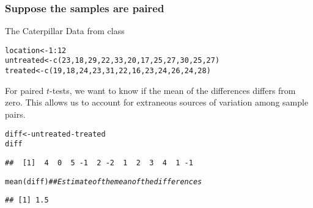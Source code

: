\documentclass[color=usenames,dvipsnames]{beamer}\usepackage[]{graphicx}\usepackage[]{color}
\makeatletter
\newcommand{\hlnum}[1]{\textcolor[rgb]{0.69,0.494,0}{#1}}%
\newcommand{\hlcom}[1]{\textcolor[rgb]{0.514,0.506,0.514}{\textit{#1}}}%
\newcommand{\hlopt}[1]{\textcolor[rgb]{0,0,0}{#1}}%
\newcommand{\hlstd}[1]{\textcolor[rgb]{0,0,0}{#1}}%
\newcommand{\hlkwb}[1]{\textcolor[rgb]{0,0.341,0.682}{#1}}%
\newcommand{\hlkwd}[1]{\textcolor[rgb]{0.004,0.004,0.506}{#1}}%
\newenvironment{kframe}{%
 \def\at@end@of@kframe{}%
 \ifinner\ifhmode%
  \def\at@end@of@kframe{\end{minipage}}%
  \begin{minipage}{\columnwidth}%
 \fi\fi%
 \def\FrameCommand##1{\hskip\@totalleftmargin \hskip-\fboxsep
 \colorbox{shadecolor}{##1}\hskip-\fboxsep
     \hskip-\linewidth \hskip-\@totalleftmargin \hskip\columnwidth}%
 \MakeFramed {\advance\hsize-\width
   \@totalleftmargin\z@ \linewidth\hsize
   \@setminipage}}%
 {\par\unskip\endMakeFramed%
 \at@end@of@kframe}
\newenvironment{knitrout}{}{} %
\makeatother
\begin{document}
\begin{frame}[fragile]
  \frametitle{Suppose the samples are paired}
  {%
    The Caterpillar Data from class}
\begin{knitrout}
\color{fgcolor}\begin{kframe}
\begin{alltt}
\hlstd{location} \hlkwb{<-} \hlnum{1}\hlopt{:}\hlnum{12}
\hlstd{untreated} \hlkwb{<-} \hlkwd{c}\hlstd{(}\hlnum{23}\hlstd{,}\hlnum{18}\hlstd{,}\hlnum{29}\hlstd{,}\hlnum{22}\hlstd{,}\hlnum{33}\hlstd{,}\hlnum{20}\hlstd{,}\hlnum{17}\hlstd{,}\hlnum{25}\hlstd{,}\hlnum{27}\hlstd{,}\hlnum{30}\hlstd{,}\hlnum{25}\hlstd{,}\hlnum{27}\hlstd{)}
\hlstd{treated} \hlkwb{<-} \hlkwd{c}\hlstd{(}\hlnum{19}\hlstd{,}\hlnum{18}\hlstd{,}\hlnum{24}\hlstd{,}\hlnum{23}\hlstd{,}\hlnum{31}\hlstd{,}\hlnum{22}\hlstd{,}\hlnum{16}\hlstd{,}\hlnum{23}\hlstd{,}\hlnum{24}\hlstd{,}\hlnum{26}\hlstd{,}\hlnum{24}\hlstd{,}\hlnum{28}\hlstd{)}
\end{alltt}
\end{kframe}
\end{knitrout}
  \pause
  \vfill
  {%
    For paired $t$-tests, we want to know if the \alert{mean of the
    differences} differs from zero. This allows us to account for
    extraneous sources of variation among sample pairs.}
  \vfill
  \pause
\begin{knitrout}
\color{fgcolor}\begin{kframe}
\begin{alltt}
\hlstd{diff} \hlkwb{<-} \hlstd{untreated}\hlopt{-}\hlstd{treated}
\hlstd{diff}
\end{alltt}
\begin{verbatim}
##  [1]  4  0  5 -1  2 -2  1  2  3  4  1 -1
\end{verbatim}
\begin{alltt}
\hlkwd{mean}\hlstd{(diff)} \hlcom{## Estimate of the mean of the differences}
\end{alltt}
\begin{verbatim}
## [1] 1.5
\end{verbatim}
\end{kframe}
\end{knitrout}

\end{frame}



\end{document}
